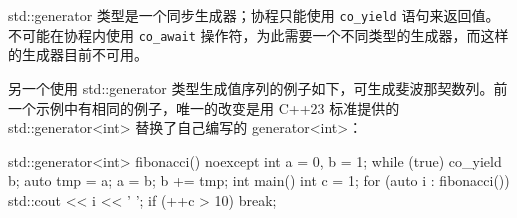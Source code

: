 std::generator 类型是一个同步生成器；协程只能使用 \verb|co_yield| 语句来返回值。不可能在协程内使用 \verb|co_await| 操作符，为此需要一个不同类型的生成器，而这样的生成器目前不可用。

另一个使用 std::generator 类型生成值序列的例子如下，可生成斐波那契数列。前一个示例中有相同的例子，唯一的改变是用 C++23 标准提供的 std::generator<int> 替换了自己编写的 generator<int>：

\begin{cpp}
std::generator<int> fibonacci() noexcept
{
    int a = 0, b = 1;
    while (true)
    {
        co_yield b;
        auto tmp = a;
        a = b;
        b += tmp;
    }
}
int main()
{
    int c = 1;
    for (auto i : fibonacci())
    {
        std::cout << i << ' ';
        if (++c > 10) break;
    }
}
\end{cpp}


